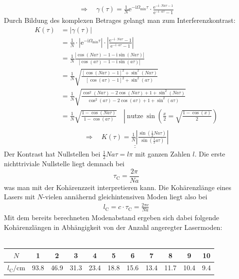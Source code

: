 \documentclass[german,  %
parskip=full,  %
]{scrartcl}
\begin{document}
\begin{align}
\Longrightarrow\quad \gamma(\tau) = \frac{1}{N} \mathrm{e}^{-\mathrm{i}\Omega_{\mathrm{min}}\tau}\cdot\frac{\mathrm{e}^{-\mathrm{i}\cdot Na\tau - 1}}{\mathrm{e}^{-\mathrm{i}\cdot a\tau} - 1}
\end{align}
Durch Bildung des komplexen Betrages gelangt man zum Interferenzkontrast:
\begin{align*}
K(\tau) &= |\gamma(\tau)| \\
&= \frac{1}{N}\cdot\left|\mathrm{e}^{-\mathrm{i}\Omega_{\mathrm{min}}\tau}\right|\cdot\left|\frac{\mathrm{e}^{-\mathrm{i}\cdot Na\tau } - 1}{\mathrm{e}^{-\mathrm{i}\cdot a\tau} - 1}\right| \\
&= \frac{1}{N} \frac{|\cos (Na\tau) - 1 - \mathrm{i}\sin(Na\tau)|}{|\cos (a\tau) - 1 - \mathrm{i}\sin(a\tau)|} \\
&= \frac{1}{N} \sqrt{\frac{\left[\cos (Na\tau) - 1\right]^2 + \sin^2(Na\tau)}{\left[\cos (a\tau) - 1\right]^2 + \sin^2(a\tau)}} \\ 
&= \frac{1}{N} \sqrt{\frac{\cos^2 (Na\tau) - 2\cos(Na\tau) + 1 + \sin^2(Na\tau)}{\cos^2 (a\tau) - 2\cos(a\tau) + 1 + \sin^2(a\tau)}} \\
&= \frac{1}{N} \sqrt{\frac{1- \cos (Na\tau) }{1 -\cos (a\tau) }} \quad\left| \ \text{nutze} \ \sin\left(\frac{x}{2} = \sqrt{\frac{1-\cos(x)}{2}}\right)\right. \\
\end{align*}
\begin{align}
\Longrightarrow\quad \underline{\underline{K(\tau) = \frac{1}{N} \left|\frac{\sin\left(\frac{1}{2}Na\tau\right) }{\sin\left(\frac{1}{2}a\tau\right) }\right| }}
\end{align}
Der Kontrast hat Nullstellen bei \(\frac{1}{2}Na\tau = l\pi\) mit ganzen Zahlen \(l\). Die erste nichttriviale Nullstelle liegt demnach bei
\[\tau_{\mathrm{C}} = \frac{2\pi}{Na}\]
was man mit der Kohärenzzeit interpretieren kann. Die Kohärenzlänge eines Lasers mit \(N\)-vielen annähernd gleichintensiven Moden liegt also bei
\begin{align}
l_{\mathrm{C}} = c\cdot\tau_{\mathrm{C}} = \frac{2\pi c}{Na} 
\end{align}
Mit dem bereits berechneten Modenabstand ergeben sich dabei folgende Kohärenzlängen in Abhängigkeit von der Anzahl angeregter Lasermoden: \\\\
\begin{table}[h!] \centering
\begin{tabular}{|c|c|c|c|c|c|c|c|c|c|c|}
\hline
\(N\) & 1 & 2 & 3 & 4 & 5 & 6 & 7 & 8 & 9 & 10\\\hline
\(l_{\mathrm{C}} \mathrm{/} \mathrm{cm}\) & 93.8 & 46.9 & 31.3 & 23.4 & 18.8 & 15.6 & 13.4 & 11.7 & 10.4 & 9.4 \\\hline
\end{tabular}
\end{table} \\\\
\end{document}
